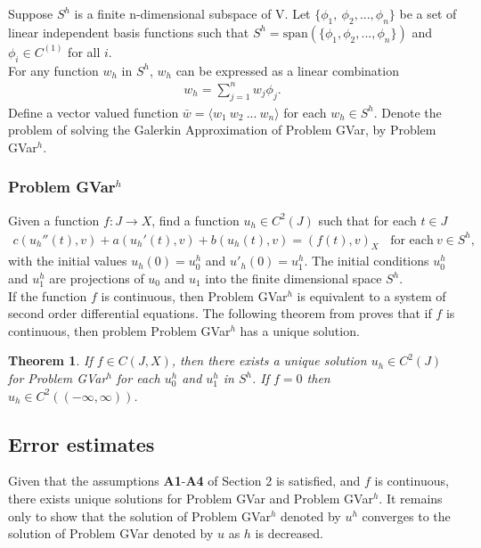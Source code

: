 \documentclass[../../main.tex]{subfiles}
\begin{document}
 Suppose $S^h$ is a finite n-dimensional subspace of V. Let $\{\phi_1, \ \phi_2,...,\phi_n\}$ be a set of linear independent basis functions such that $S^h = \textrm{span}(\{\phi_1, \phi_2, ..., \phi_n \})$ and $\phi_i \in C^{(1)}$ for all $i$.\\

For any function $w_h$ in $S^h$, $w_h$ can be expressed as a linear combination
\begin{eqnarray*}
	w_h = \sum_{j=1}^n w_j \phi_j.
\end{eqnarray*} Define a vector valued function $\bar{w} = \langle w_1 \ w_2 \ ... \ w_n \rangle$ for each $w_h \in S^h$. Denote the problem of solving the Galerkin Approximation of Problem GVar, by Problem GVar$^h$.

\subsubsection*{Problem GVar$^h$}
Given a function $f: J \rightarrow X$, find a function $u_h \in C^2(J)$ such that for each $t\in J$
\begin{eqnarray}
 c(u_h''(t),v)+a(u_h'(t),v)+b(u_h(t),v)= (f(t),v)_{X} \ \ \ \ \textrm{for each} \ v \in S^h, \label{DC_E2} 
\end{eqnarray}
with the initial values $u_h(0)=u^h_{0}$ and $u'_h(0)=u^h_{1}$. The initial conditions $u^h_{0}$ and $u^h_{1}$ are projections of $u_0$ and $u_1$ into the finite dimensional space $S^h$.\\

If the function $f$ is continuous, then Problem GVar$^h$ is equivalent to a system of second order differential equations. The following theorem from \cite{BV13} proves that if $f$ is continuous, then problem Problem GVar$^h$ has a unique solution.

\newtheorem{DC_Thm2}{Theorem}
\begin{DC_Thm2} \label{DC_THM2}
	If $f \in C(J,X)$, then there exists a unique solution $u_h \in C^2(J)$ for Problem GVar$^h$ for each $u_0^h$ and $u_1^h$ in $S^h$. If $f = 0$ then $u_h \in C^2((-\infty, \infty))$.
\end{DC_Thm2}

\subsection{Error estimates}
Given that the assumptions \textbf{A1}-\textbf{A4} of Section 2 is satisfied, and $f$ is continuous, there exists unique solutions for  Problem GVar and Problem GVar$^h$. It remains only to show that the solution of Problem GVar$^h$ denoted by $u^h$ converges to the solution of Problem GVar denoted by $u$ as $h$ is decreased.\\
\end{document}
